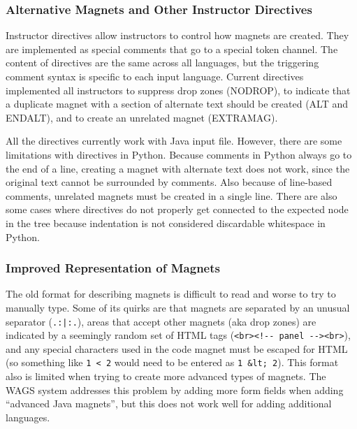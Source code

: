 \documentclass[letter,10pt,final]{article}
\begin{document}
\subsubsection{Alternative Magnets and Other Instructor Directives}

Instructor directives allow instructors to control how magnets are 
created. They are implemented as special comments that go to a 
special token channel. The content of directives are the same across all 
languages, but the triggering comment syntax is specific to each input 
language. Current directives implemented all instructors to suppress 
drop zones (NODROP), to indicate that a duplicate magnet with a section 
of alternate text should be created (ALT and ENDALT), and to create an 
unrelated magnet (EXTRAMAG).

All the directives currently work with Java input file. However, there 
are some limitations with directives in Python. Because comments in 
Python always go to the end of a line, creating a magnet with alternate 
text does not work, since the original text cannot be surrounded by 
comments. Also because of line-based comments, unrelated magnets must 
be created in a single line. There are also some cases where directives 
do not properly get connected to the expected node in the tree because 
indentation is not considered discardable whitespace in Python.

\subsubsection{Improved Representation of Magnets}

The old format for describing magnets is difficult to read and worse to 
try to manually type. Some of its quirks are that magnets are separated 
by an unusual separator (\verb~.:|:.~), areas that accept other magnets 
(aka drop zones) are indicated by a seemingly random set of HTML tags 
(\verb~<br><!-- panel --><br>~), and any special characters used in the 
code magnet must be escaped for HTML (so something like \verb~1 < 2~ 
would need to be entered as \verb~1 &lt; 2~). This format also is 
limited when trying to create more advanced types of magnets. The WAGS 
system addresses this problem by adding more form fields when adding 
``advanced Java magnets'', but this does not work well for adding 
additional languages.
\end{document}
